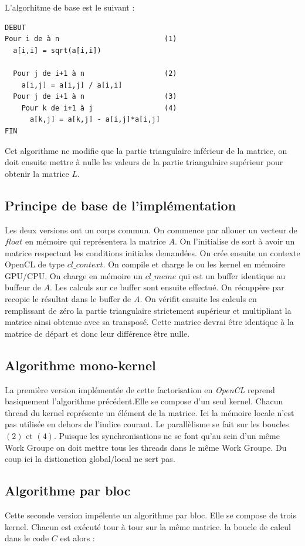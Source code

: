 \documentclass[paper=a4, fontsize=11pt]{scrartcl} %
\numberwithin{equation}{section} %
\numberwithin{figure}{section} %
\numberwithin{table}{section} %
\begin{document}
L'algorhitme de base est le suivant :
\begin{verbatim}
DEBUT
Pour i de à n                         (1)
  a[i,i] = sqrt(a[i,i])
  
  Pour j de i+1 à n                   (2)
    a[i,j] = a[i,j] / a[i,i]
  Pour j de i+1 à n                   (3)
    Pour k de i+1 à j                 (4)
      a[k,j] = a[k,j] - a[i,j]*a[i,j] 
FIN
\end{verbatim}

Cet algorithme ne modifie que la partie triangulaire inférieur de la
matrice, on doit ensuite mettre à nulle les valeurs de la partie
triangulaire supérieur pour obtenir la matrice $L$.


\subsection{Principe de base de l'implémentation}
Les deux versions ont un corps commun.  On commence par allouer un
vecteur de $float$ en mémoire qui représentera la matrice $A$. On
l'initialise de sort à avoir un matrice respectant les conditions
initiales demandées. On crée ensuite un contexte OpenCL de type
$cl\_context$. On compile et charge le ou les kernel en mémoire
GPU/CPU. On charge en mémoire un $cl\_meme$ qui est un buffer
identique au buffeur de $A$. Les calculs sur ce buffer sont ensuite
effectué. On récuppère par recopie le résultat dans le buffer de $A$.
On vérifit ensuite les calculs en remplissant de zéro la partie
triangulaire strictement supérieur et multipliant la matrice ainsi
obtenue avec sa transposé. Cette matrice devrai être identique à la
matrice de départ et donc leur différence être nulle.


\subsection{Algorithme mono-kernel}
La première version implémentée de cette factorisation en
\textit{OpenCL} reprend basiquement l'algorithme précédent.Elle se
compose d'un seul kernel. Chacun thread du kernel représente un
élément de la matrice. Ici la mémoire locale n'est pas utilisée en
dehors de l'indice courant.  Le parallèlisme se fait sur les boucles
$(2)$ et $(4)$.  Puisque les synchronisations ne se font qu'au sein
d'un même Work Groupe on doit mettre tous les threads dans le même
Work Groupe. Du coup ici la distionction global/local ne sert pas.


\subsection{Algorithme par bloc}
Cette seconde version impélente un algorithme par bloc. Elle se
compose de trois kernel. Chacun est exécuté tour à tour sur la
même matrice. la boucle de calcul dans le code $C$ est alors :
\end{document}
